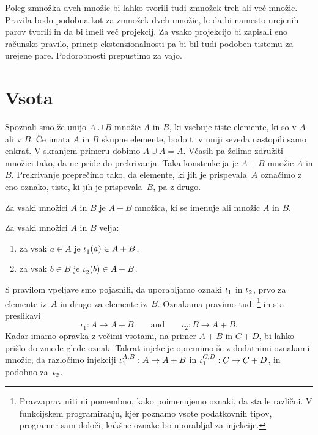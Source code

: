 Poleg zmnožka dveh množic bi lahko tvorili tudi zmnožek treh ali več množic. Pravila bodo
podobna kot za zmnožek dveh množic, le da bi namesto urejenih parov tvorili  in da bi imeli več projekcij. Za vsako projekcijo bi zapisali eno računsko
pravilo, princip ekstenzionalnosti pa bi bil tudi podoben tistemu za urejene pare.
Podorobnosti prepustimo za vajo.


\section{Vsota}
\label{sec:vsota}

Spoznali smo že unijo $A \cup B$ množic $A$ in $B$, ki vsebuje tiste elemente, ki so v $A$
ali v $B$. Če imata $A$ in $B$ skupne elemente, bodo ti v uniji seveda nastopili samo
enkrat. V skranjem primeru dobimo $A \cup A = A$. Včasih pa želimo združiti množici tako,
da ne pride do prekrivanja. Taka konstrukcija je  $A + B$ množic $A$ in $B$.
Prekrivanje preprečimo tako, da elemente, ki jih je prispevala~$A$ označimo z eno oznako,
tiste, ki jih je prispevala~$B$, pa z drugo.

\begin{pravilo}[Vsota]
  \label{vsota:tvorba}
  Za vsaki množici $A$ in $B$ je $A + B$ množica, ki se imenuje  ali
   množic $A$ in $B$.
\end{pravilo}

\begin{pravilo}
  \label{vsota:vpeljava}
  Za vsaki množici $A$ in $B$ velja:
  \begin{enumerate}
  \item za vsak $a \in A$ je $\inl(a) \in A + B$,
  \item za vsak $b \in B$ je $\inr(b) \in A + B$.
  \end{enumerate}
\end{pravilo}

S pravilom vpeljave smo pojasnili, da uporabljamo oznaki $\inl$ in $\inr$, prvo za
elemente iz~$A$ in drugo za elemente iz~$B$. Oznakama pravimo tudi
\footnote{Pravzaprav niti ni pomembno, kako poimenujemo oznaki, da sta le
  različni. V funkcijskem programiranju, kjer poznamo vsote podatkovnih tipov, programer
  sam določi, kakšne oznake bo uporabljal za injekcije.} in sta preslikavi
%
\begin{equation*}
  \iota_1 : A \to A + B
  \qquad\text{and}\qquad
  \iota_2 : B \to A + B.
\end{equation*}
%
Kadar imamo opravka z večimi vsotami, na primer $A + B$ in $C + D$, bi lahko prišlo do
zmede glede oznak. Takrat injekcije opremimo še z dodatnimi oznakami množic, da razločimo
injekciji $\inl[A][B] : A \to A + B$ in $\inl[C][D] : C \to C + D$, in podobno za~$\inr$.

